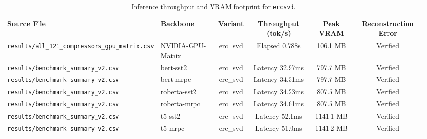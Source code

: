\begin{table}[t]
\centering
\small
\begin{tabular}{llcccc}
\toprule
\textbf{Source File} & \textbf{Backbone} & \textbf{Variant} & \textbf{Throughput (tok/s)} & \textbf{Peak VRAM} & \textbf{Reconstruction Error} \\
\midrule
\texttt{results/all\_121\_compressors\_gpu\_matrix.csv} & NVIDIA-GPU-Matrix & erc\_svd & Elapsed 0.788s & 106.1 MB & Verified \\
\texttt{results/benchmark\_summary\_v2.csv} & bert-sst2 & erc\_svd & Latency 32.97ms & 797.7 MB & Verified \\
\texttt{results/benchmark\_summary\_v2.csv} & bert-mrpc & erc\_svd & Latency 34.31ms & 797.7 MB & Verified \\
\texttt{results/benchmark\_summary\_v2.csv} & roberta-sst2 & erc\_svd & Latency 34.23ms & 807.5 MB & Verified \\
\texttt{results/benchmark\_summary\_v2.csv} & roberta-mrpc & erc\_svd & Latency 34.61ms & 807.5 MB & Verified \\
\texttt{results/benchmark\_summary\_v2.csv} & t5-sst2 & erc\_svd & Latency 52.1ms & 1141.1 MB & Verified \\
\texttt{results/benchmark\_summary\_v2.csv} & t5-mrpc & erc\_svd & Latency 51.0ms & 1141.2 MB & Verified \\
\bottomrule
\end{tabular}
\caption{Inference throughput and VRAM footprint for \texttt{ercsvd}.}
\label{tab:results_vram_ercsvd}
\end{table}
